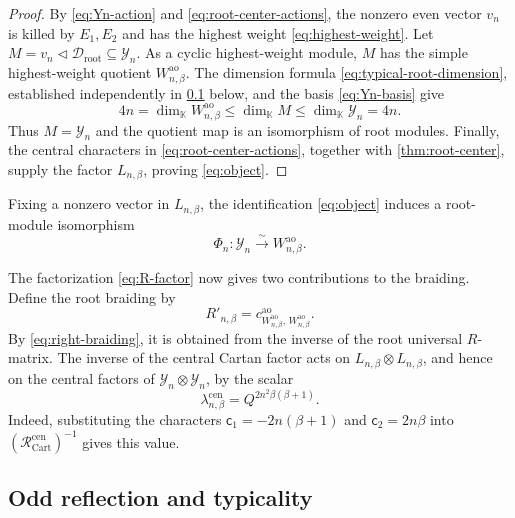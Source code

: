 \documentclass[11pt,a4paper]{article}
\newcommand{\hK}{\mathbb K}
\newcommand{\ot}{\otimes}
\newcommand{\tri}{\mathbin{\triangleleft}}
\newcommand{\ao}{\mathrm{ao}}
\newcommand{\cen}{\mathrm{cen}}
\newcommand{\rootpart}{\mathrm{root}}
\theoremstyle{definition}
\theoremstyle{remark}
\begin{document}
\begin{proof}
By \eqref{eq:Yn-action} and \eqref{eq:root-center-actions}, the nonzero
even vector \(v_n\) is killed by \(E_1,E_2\) and has the highest weight
\eqref{eq:highest-weight}.  Let
\(M=v_n\tri\mathcal D_{\rootpart}\subseteq\mathcal Y_n\).
As a cyclic highest-weight module, \(M\) has the simple highest-weight
quotient \(W_{n,\beta}^{\ao}\).  The dimension formula
\eqref{eq:typical-root-dimension}, established independently in
\cref{sec:module-typicality} below, and the basis
\eqref{eq:Yn-basis} give
\[
 4n=\dim_{\hK}W_{n,\beta}^{\ao}
 \leq\dim_{\hK}M
 \leq\dim_{\hK}\mathcal Y_n=4n.
\]
Thus \(M=\mathcal Y_n\) and the quotient map is an isomorphism of
root modules.  Finally, the central characters in
\eqref{eq:root-center-actions}, together with
\cref{thm:root-center}, supply the factor \(L_{n,\beta}\), proving
\eqref{eq:object}.
\end{proof}

Fixing a nonzero vector in \(L_{n,\beta}\), the identification
\eqref{eq:object} induces a root-module isomorphism
\[
 \Phi_n:\mathcal Y_n\xrightarrow{\sim}W_{n,\beta}^{\ao}.
\]

The factorization \eqref{eq:R-factor} now gives two contributions to
the braiding.  Define the root braiding by
\[
 R'_{n,\beta}
 =c^{\ao}_{W_{n,\beta}^{\ao},\,W_{n,\beta}^{\ao}}.
\]
By \eqref{eq:right-braiding}, it is obtained from the inverse of the
root universal \(R\)-matrix.  The inverse of the central Cartan factor
acts on \(L_{n,\beta}\ot L_{n,\beta}\), and hence on the central
factors of \(\mathcal Y_n\ot\mathcal Y_n\), by the scalar
\begin{equation}\label{eq:lambda}
 \lambda_{n,\beta}^{\cen}=Q^{2n^2\beta(\beta+1)}.
\end{equation}
Indeed, substituting the characters
\(\mathsf c_1=-2n(\beta+1)\) and \(\mathsf c_2=2n\beta\)
into \((\mathcal R_{\mathrm{Cart}}^{\cen})^{-1}\) gives this value.

\subsection{Odd reflection and typicality}
\label{sec:module-typicality}
\end{document}
